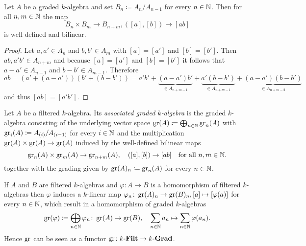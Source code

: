 \begin{lem}
 Let $A$ be a graded $k$-algebra and set $B_n \coloneqq A_n/A_{n-1}$ for every $n \in \mathbb{N}$. Then for all $n,m \in \mathbb{N}$ the map
 \[
  B_n \times B_m \to B_{n+m}, ([a], [b]) \mapsto [ab]
 \]
 is well-defined and bilinear.
\end{lem}
\begin{proof}
 Let $a, a' \in A_n$ and $b, b' \in A_m$ with $[a] = [a']$ and $[b] = [b']$. Then $ab, a'b' \in A_{n+m}$ and because $[a] = [a']$ and $[b] = [b']$ it follows that $a-a' \in A_{n-1}$ and $b-b' \in A_{m-1}$. Therefore
 \[
  ab
  = (a'+(a-a'))(b'+(b-b'))
  = a'b' + \underbrace{(a-a')b'}_{\in A_{n+m-1}} + \underbrace{a'(b-b')}_{\in A_{n+m-1}} + \underbrace{(a-a')(b-b')}_{\in A_{n+m-2}}
 \]
 and thus $[ab] = [a'b']$.
\end{proof}


\begin{defi}
 Let $A$ be a filtered $k$-algebra. Its \emph{associated graded $k$-algebra} is the graded $k$-algebra consisting of the underlying vector space $\operatorname{gr}(A) \coloneqq \bigoplus_{n \in \mathbb{N}} \operatorname{gr}_n(A)$ with $\operatorname{gr}_i(A) \coloneqq A_{(i)} / A_{(i-1)}$ for every $i \in \mathbb{N}$ and the multiplication $\operatorname{gr}(A) \times \operatorname{gr}(A) \to \operatorname{gr}(A)$ induced by the well-defined bilinear maps
 \[
  \operatorname{gr}_n(A) \times \operatorname{gr}_m(A) \to \operatorname{gr}_{n+m}(A), \quad
  ([a],[b]) \to [ab]
  \quad\text{for all $n,m \in \mathbb{N}$}.
 \]
 together with the grading given by $\operatorname{gr}(A)_n \coloneqq \operatorname{gr}_n(A)$ for every $n \in \mathbb{N}$.
\end{defi}


\begin{rem}
 If $A$ and $B$ are filtered $k$-algebras and $\varphi \colon A \to B$ is a homomorphism of filtered $k$-algebras then $\varphi$ induces a $k$-linear map $\varphi_n \colon \operatorname{gr}(A)_n \to \operatorname{gr}(B)_n, [a] \mapsto [\varphi(a)]$ for every $n \in \mathbb{N}$, which result in a homomorphism of graded $k$-algebras
 \[
  \operatorname{gr}(\varphi) \coloneqq \bigoplus_{n \in \mathbb{N}} \varphi_n \colon \operatorname{gr}(A) \to \operatorname{gr}(B),
  \quad
  \sum_{n \in \mathbb{N}} a_n \mapsto \sum_{n \in \mathbb{N}} \varphi(a_n).
 \]
 Hence $\operatorname{gr}$ can be seen as a functor $\operatorname{gr} \colon k\text{-}\mathbf{Filt} \to k\text{-}\mathbf{Grad}$.
\end{rem}


